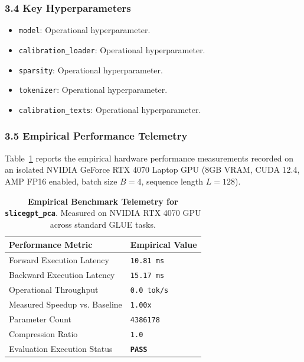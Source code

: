 \subsubsection*{3.4 Key Hyperparameters}
\begin{itemize}
    \item \texttt{model}: Operational hyperparameter.
    \item \texttt{calibration\_loader}: Operational hyperparameter.
    \item \texttt{sparsity}: Operational hyperparameter.
    \item \texttt{tokenizer}: Operational hyperparameter.
    \item \texttt{calibration\_texts}: Operational hyperparameter.
\end{itemize}

\subsubsection*{3.5 Empirical Performance Telemetry}
Table~\ref{tab:telemetry_slicegpt_pca} reports the empirical hardware performance measurements recorded on an isolated NVIDIA GeForce RTX 4070 Laptop GPU (8GB VRAM, CUDA 12.4, AMP FP16 enabled, batch size $B=4$, sequence length $L=128$).

\begin{table}[h]
\centering
\small
\caption{\textbf{Empirical Benchmark Telemetry for \texttt{slicegpt\_pca}}. Measured on NVIDIA RTX 4070 GPU across standard GLUE tasks.}
\label{tab:telemetry_slicegpt_pca}
\begin{tabularx}{\columnwidth}{lX}
\toprule
\textbf{Performance Metric} & \textbf{Empirical Value} \\
\midrule
Forward Execution Latency & \texttt{10.81 ms} \\
Backward Execution Latency & \texttt{15.17 ms} \\
Operational Throughput & \texttt{0.0 tok/s} \\
Measured Speedup vs. Baseline & \texttt{1.00x} \\
Parameter Count & \texttt{4386178} \\
Compression Ratio & \texttt{1.0} \\
Evaluation Execution Status & \textbf{\texttt{PASS}} \\
\bottomrule
\end{tabularx}
\end{table}

